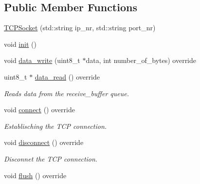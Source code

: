\subsection*{Public Member Functions}
\begin{DoxyCompactItemize}
\item 
\hyperlink{class_t_c_p_socket_ab084bbd93d9b76fd9223f92c12948dde}{T\+C\+P\+Socket} (std\+::string ip\+\_\+nr, std\+::string port\+\_\+nr)
\item 
void \hyperlink{class_t_c_p_socket_ac3622605b73b61ef3c03f49b54036f1e}{init} ()
\item 
void \hyperlink{class_t_c_p_socket_ae083947a4caa02a1a8dd1cc59b2514ac}{data\+\_\+write} (uint8\+\_\+t $\ast$data, int number\+\_\+of\+\_\+bytes) override
\item 
\hypertarget{class_t_c_p_socket_a7ed9a60ec58a60fb132dfa620a4f16a5}{}uint8\+\_\+t $\ast$ \hyperlink{class_t_c_p_socket_a7ed9a60ec58a60fb132dfa620a4f16a5}{data\+\_\+read} () override\label{class_t_c_p_socket_a7ed9a60ec58a60fb132dfa620a4f16a5}

\begin{DoxyCompactList}\small\item\em Reads data from the receive\+\_\+buffer queue. \end{DoxyCompactList}\item 
\hypertarget{class_t_c_p_socket_a66dec2ee5f3a42c066612dcc9974c7bd}{}void \hyperlink{class_t_c_p_socket_a66dec2ee5f3a42c066612dcc9974c7bd}{connect} () override\label{class_t_c_p_socket_a66dec2ee5f3a42c066612dcc9974c7bd}

\begin{DoxyCompactList}\small\item\em Establisching the T\+C\+P connection. \end{DoxyCompactList}\item 
\hypertarget{class_t_c_p_socket_a0d5643435da61bb4a247240e349ac294}{}void \hyperlink{class_t_c_p_socket_a0d5643435da61bb4a247240e349ac294}{disconnect} () override\label{class_t_c_p_socket_a0d5643435da61bb4a247240e349ac294}

\begin{DoxyCompactList}\small\item\em Disconnet the T\+C\+P connection. \end{DoxyCompactList}\item 
\hypertarget{class_t_c_p_socket_a6d0240e24c16c9df20bb0d848e514ae9}{}void \hyperlink{class_t_c_p_socket_a6d0240e24c16c9df20bb0d848e514ae9}{flush} () override\label{class_t_c_p_socket_a6d0240e24c16c9df20bb0d848e514ae9}


\end{DoxyCompactItemize}
